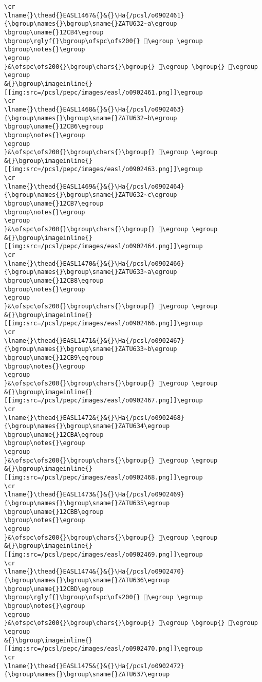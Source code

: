 \begin{verbatim}
\cr
\lname{}\thead{}EASL1467&{}&{}\Ha{/pcsl/o0902461}{\bgroup\names{}\bgroup\sname{}ZATU632∼a\egroup
\bgroup\uname{}12CB4\egroup
\bgroup\rglyf{}\bgroup\ofspc\ofs200{} 𒲴\egroup \egroup
\bgroup\notes{}\egroup
\egroup
}&\ofspc\ofs200{}\bgroup\chars{}\bgroup{} 𒲴\egroup \bgroup{} 𒲵\egroup \egroup
&{}\bgroup\imageinline{}[[img:src=/pcsl/pepc/images/easl/o0902461.png]]\egroup
\cr
\lname{}\thead{}EASL1468&{}&{}\Ha{/pcsl/o0902463}{\bgroup\names{}\bgroup\sname{}ZATU632∼b\egroup
\bgroup\uname{}12CB6\egroup
\bgroup\notes{}\egroup
\egroup
}&\ofspc\ofs200{}\bgroup\chars{}\bgroup{} 𒲶\egroup \egroup
&{}\bgroup\imageinline{}[[img:src=/pcsl/pepc/images/easl/o0902463.png]]\egroup
\cr
\lname{}\thead{}EASL1469&{}&{}\Ha{/pcsl/o0902464}{\bgroup\names{}\bgroup\sname{}ZATU632∼c\egroup
\bgroup\uname{}12CB7\egroup
\bgroup\notes{}\egroup
\egroup
}&\ofspc\ofs200{}\bgroup\chars{}\bgroup{} 𒲷\egroup \egroup
&{}\bgroup\imageinline{}[[img:src=/pcsl/pepc/images/easl/o0902464.png]]\egroup
\cr
\lname{}\thead{}EASL1470&{}&{}\Ha{/pcsl/o0902466}{\bgroup\names{}\bgroup\sname{}ZATU633∼a\egroup
\bgroup\uname{}12CB8\egroup
\bgroup\notes{}\egroup
\egroup
}&\ofspc\ofs200{}\bgroup\chars{}\bgroup{} 𒲸\egroup \egroup
&{}\bgroup\imageinline{}[[img:src=/pcsl/pepc/images/easl/o0902466.png]]\egroup
\cr
\lname{}\thead{}EASL1471&{}&{}\Ha{/pcsl/o0902467}{\bgroup\names{}\bgroup\sname{}ZATU633∼b\egroup
\bgroup\uname{}12CB9\egroup
\bgroup\notes{}\egroup
\egroup
}&\ofspc\ofs200{}\bgroup\chars{}\bgroup{} 𒲹\egroup \egroup
&{}\bgroup\imageinline{}[[img:src=/pcsl/pepc/images/easl/o0902467.png]]\egroup
\cr
\lname{}\thead{}EASL1472&{}&{}\Ha{/pcsl/o0902468}{\bgroup\names{}\bgroup\sname{}ZATU634\egroup
\bgroup\uname{}12CBA\egroup
\bgroup\notes{}\egroup
\egroup
}&\ofspc\ofs200{}\bgroup\chars{}\bgroup{} 𒲺\egroup \egroup
&{}\bgroup\imageinline{}[[img:src=/pcsl/pepc/images/easl/o0902468.png]]\egroup
\cr
\lname{}\thead{}EASL1473&{}&{}\Ha{/pcsl/o0902469}{\bgroup\names{}\bgroup\sname{}ZATU635\egroup
\bgroup\uname{}12CBB\egroup
\bgroup\notes{}\egroup
\egroup
}&\ofspc\ofs200{}\bgroup\chars{}\bgroup{} 𒲻\egroup \egroup
&{}\bgroup\imageinline{}[[img:src=/pcsl/pepc/images/easl/o0902469.png]]\egroup
\cr
\lname{}\thead{}EASL1474&{}&{}\Ha{/pcsl/o0902470}{\bgroup\names{}\bgroup\sname{}ZATU636\egroup
\bgroup\uname{}12CBD\egroup
\bgroup\rglyf{}\bgroup\ofspc\ofs200{} 𒲽\egroup \egroup
\bgroup\notes{}\egroup
\egroup
}&\ofspc\ofs200{}\bgroup\chars{}\bgroup{} 𒲼\egroup \bgroup{} 𒲽\egroup \egroup
&{}\bgroup\imageinline{}[[img:src=/pcsl/pepc/images/easl/o0902470.png]]\egroup
\cr
\lname{}\thead{}EASL1475&{}&{}\Ha{/pcsl/o0902472}{\bgroup\names{}\bgroup\sname{}ZATU637\egroup

\end{verbatim}
